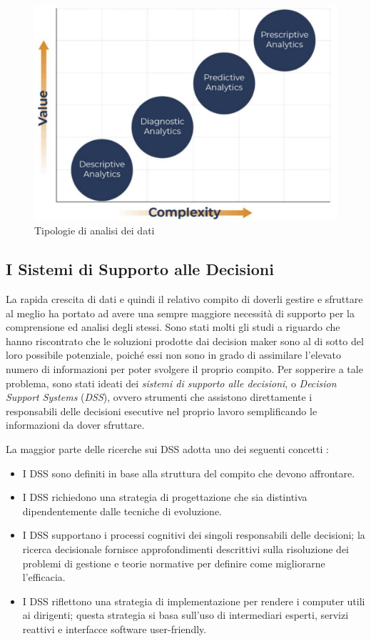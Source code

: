 \begin{figure}[H]
    \centering
    \includegraphics[width=0.75\linewidth]{figure/capitolo_2/Analytics Models.pdf}
    \caption{Tipologie di analisi dei dati}
    \label{fig:Analytics Models}
\end{figure}

\subsection{I Sistemi di Supporto alle Decisioni}

La rapida crescita di dati e quindi il relativo compito di doverli gestire e sfruttare al meglio ha portato ad avere una sempre maggiore necessità di supporto per la comprensione ed analisi degli stessi. Sono stati molti gli studi a riguardo che hanno riscontrato che le soluzioni prodotte dai decision maker sono al di sotto del loro possibile potenziale, poiché essi non sono in grado di assimilare l'elevato numero di informazioni per poter svolgere il proprio compito. Per sopperire a tale problema, sono stati ideati dei \textit{sistemi di supporto alle decisioni}, o \textit{Decision Support Systems} (\textit{DSS}), ovvero strumenti che assistono direttamente i responsabili delle decisioni esecutive nel proprio lavoro semplificando le informazioni da dover sfruttare.\cite{dss_introduction}

La maggior parte delle ricerche sui DSS adotta uno dei seguenti concetti \cite{mit_keen_dss}:

\begin{itemize}
    \item I DSS sono definiti in base alla struttura del compito che devono affrontare.
    \item I DSS richiedono una strategia di progettazione che sia distintiva dipendentemente dalle tecniche di evoluzione.
    \item I DSS supportano i processi cognitivi dei singoli responsabili delle decisioni; la ricerca decisionale fornisce approfondimenti descrittivi sulla risoluzione dei problemi di gestione e teorie normative per definire come migliorarne l'efficacia.
    \item I DSS riflettono una strategia di implementazione per rendere i computer utili ai dirigenti; questa strategia si basa sull'uso di intermediari esperti, servizi reattivi e interfacce software user-friendly.
\end{itemize}

